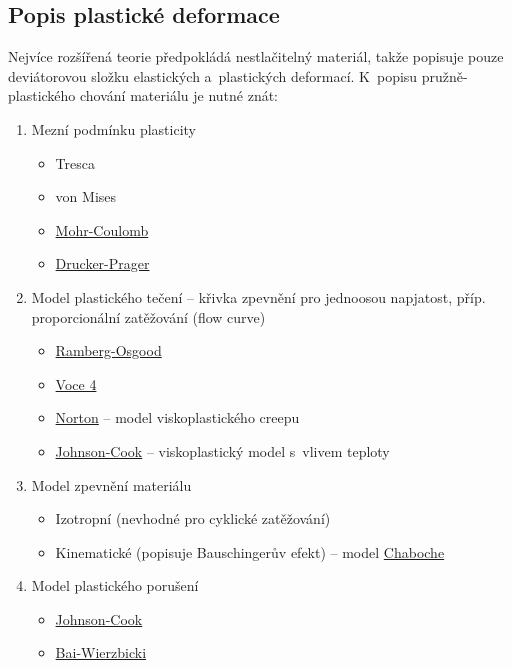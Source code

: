 \subsection{Popis plastické deformace}
Nejvíce rozšířená teorie předpokládá nestlačitelný materiál, takže popisuje pouze deviátorovou složku elastických a~plastických deformací.
K~popisu pružně-plastického chování materiálu je nutné znát:
\begin{enumerate}
	\item Mezní podmínku plasticity
	\begin{itemize}
		\item Tresca
		\item von Mises
		\item \hyperref[sec:mohr-coulomb]{Mohr-Coulomb}
		\item \hyperref[sec:drucker-prager]{Drucker-Prager}
	\end{itemize}
	\item Model plastického tečení -- křivka zpevnění pro jednoosou napjatost, příp. proporcionální zatěžování (flow curve)
	\begin{itemize}
		\item \hyperref[sec:ramberg-osgood]{Ramberg-Osgood}
		\item \hyperref[sec:model-voce-4]{Voce 4}
		\item \hyperref[sec:norton]{Norton} -- model viskoplastického creepu
		\item \hyperref[sec:johnson-cook-viskoplasticita]{Johnson-Cook} -- viskoplastický model s~vlivem teploty
	\end{itemize}
	\item Model zpevnění materiálu
	\begin{itemize}
		\item Izotropní (nevhodné pro cyklické zatěžování)
		\item Kinematické (popisuje Bauschingerův efekt) -- model \hyperref[sec:chaboche]{Chaboche}
	\end{itemize}
	\item Model plastického porušení
	\begin{itemize}
		\item \hyperref[sec:johnson-cook-poruseni]{Johnson-Cook}
		\item \hyperref[sec:bai-wierzbicki]{Bai-Wierzbicki}
	\end{itemize}
\end{enumerate}

